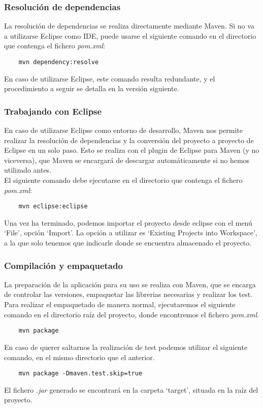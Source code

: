 
\subsubsection{Resolución de dependencias}
La resolución de dependencias se realiza directamente mediante Maven.
Si no va a utilizarse Eclipse como IDE, puede usarse el siguiente comando en el directorio que contenga el fichero \emph{pom.xml}:
\begin{verbatim}
	mvn dependency:resolve
\end{verbatim}
En caso de utilizarse Eclipse, este comando resulta redundante, y el procedimiento a seguir se detalla en la versión siguiente.

\subsubsection{Trabajando con Eclipse}
En caso de utilizarse Eclipse como entorno de desarrollo, Maven nos permite realizar la resolución de dependencias y la conversión del proyecto a proyecto de Eclipse en un solo paso.
Esto se realiza con el plugin de Eclipse para Maven (y no viceversa), que Maven se encargará de descargar automáticamente si no hemos utilizado antes.
\\
El siguiente comando debe ejecutarse en el directorio que contenga el fichero \emph{pom.xml}:
\begin{verbatim}
	mvn eclipse:eclipse
\end{verbatim}
Una vez ha terminado, podemos importar el proyecto desde eclipse con el menú `File', opción `Import'.
La opción a utilizar es `Existing Projects into Workspace', a la que solo tenemos que indicarle donde se encuentra almacenado el proyecto.

\subsubsection{Compilación y empaquetado}
La preparación de la aplicación para su uso se realiza con Maven, que se encarga de controlar las versiones, empaquetar las librerias necesarias y realizar los test.
Para realizar el empaquetado de manera normal, ejecutaremos el siguiente comando en el directorio raíz del proyecto, donde encontremos el fichero \emph{pom.xml}.
\begin{verbatim}
	mvn package
\end{verbatim}
En caso de querer saltarnos la realización de test podemos utilizar el siguiente comando, en el mismo directorio que el anterior.
\begin{verbatim}
	mvn package -Dmaven.test.skip=true
\end{verbatim}
El fichero \emph{.jar} generado se encontrará en la carpeta `target', situada en la raíz del proyecto.